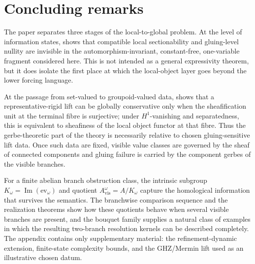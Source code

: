 \section{Concluding remarks}\label{sec:conclusion}

The paper separates three stages of the local-to-global problem. At the level of information states,  shows that compatible local sectionability and gluing-level nullity are invisible in the automorphism-invariant, constant-free, one-variable fragment considered here. This is not intended as a general expressivity theorem, but it does isolate the first place at which the local-object layer goes beyond the lower forcing language.

At the passage from set-valued to groupoid-valued data,  shows that a representative-rigid lift can be globally conservative only when the sheafification unit at the terminal fibre is surjective; under $H^1$-vanishing and separatedness, this is equivalent to sheafiness of the local object functor at that fibre. Thus the gerbe-theoretic part of the theory is necessarily relative to chosen gluing-sensitive lift data. Once such data are fixed, visible value classes are governed by the sheaf of connected components and gluing failure is carried by the component gerbes of the visible branches.

For a finite abelian branch obstruction class, the intrinsic subgroup $K_\omega=\operatorname{Im}(\mathrm{ev}_\omega)$ and quotient $A_{\mathrm{vis}}^\omega=A/K_\omega$ capture the homological information that survives the semantics. The branchwise comparison sequence and the realization theorems show how these quotients behave when several visible branches are present, and the bouquet family supplies a natural class of examples in which the resulting two-branch resolution kernels can be described completely. The appendix contains only supplementary material: the refinement-dynamic extension, finite-state complexity bounds, and the GHZ/Mermin lift used as an illustrative chosen datum.
